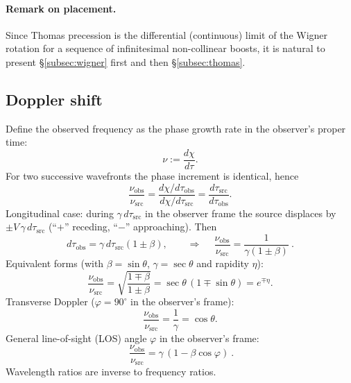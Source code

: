 \documentclass[11pt]{article}
\numberwithin{equation}{section}
\begin{document}
\paragraph{Remark on placement.}
Since Thomas precession is the differential (continuous) limit of the Wigner
rotation for a sequence of infinitesimal non-collinear boosts, it is natural to
present \S\ref{subsec:wigner} first and then \S\ref{subsec:thomas}.
\subsection{Doppler shift}
Define the observed frequency as the phase growth rate in the observer's proper time:
\begin{equation}
\nu:=\frac{d\chi}{d\tau}.
\label{eq:381}
\end{equation}
For two successive wavefronts the phase increment is identical, hence
\begin{equation}
\frac{\nu_{\mathrm{obs}}}{\nu_{\mathrm{src}}}
=\frac{d\chi/d\tau_{\mathrm{obs}}}{d\chi/d\tau_{\mathrm{src}}}
=\frac{d\tau_{\mathrm{src}}}{d\tau_{\mathrm{obs}}}.
\label{eq:382}
\end{equation}
Longitudinal case: during $\gamma\,d\tau_{\mathrm{src}}$ in the observer frame the source displaces by $\pm V\,\gamma\,d\tau_{\mathrm{src}}$ (``$+$'' receding, ``$-$'' approaching). Then
\begin{equation}
d\tau_{\mathrm{obs}}=\gamma\,d\tau_{\mathrm{src}}(1\pm\beta),\qquad
\Rightarrow\quad
\boxed{\ \frac{\nu_{\mathrm{obs}}}{\nu_{\mathrm{src}}}=\frac{1}{\gamma(1\pm\beta)}\ }.
\label{eq:384}
\end{equation}
Equivalent forms (with $\beta=\sin\theta$, $\gamma=\sec\theta$ and rapidity $\eta$):
\begin{equation}
\frac{\nu_{\mathrm{obs}}}{\nu_{\mathrm{src}}}
=\sqrt{\frac{1\mp\beta}{1\pm\beta}}
=\sec\theta\,(1\mp\sin\theta)
=e^{\mp\eta}.
\label{eq:385}
\end{equation}
Transverse Doppler ($\varphi=90^\circ$ in the observer's frame):
\begin{equation}
\frac{\nu_{\mathrm{obs}}}{\nu_{\mathrm{src}}}=\frac{1}{\gamma}=\cos\theta.
\label{eq:389}
\end{equation}
General line-of-sight (LOS) angle $\varphi$ in the observer's frame:
\begin{equation}
\boxed{\ \frac{\nu_{\mathrm{obs}}}{\nu_{\mathrm{src}}}=\gamma\,(1-\beta\cos\varphi)\ }.
\label{eq:3810}
\end{equation}
Wavelength ratios are inverse to frequency ratios.
\end{document}
